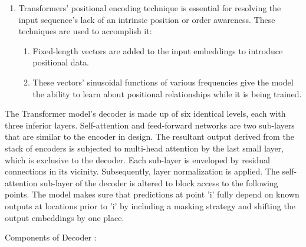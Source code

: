 \begin{enumerate}
\begin{enumerate}
    \end{enumerate}

    \item Transformers' positional encoding technique is essential for resolving the input sequence's lack of an intrinsic position or order awareness. These techniques are used to accomplish it:


    \begin{enumerate}
      \item  Fixed-length vectors are added to the input embeddings to introduce positional data.
       \item  These vectors' sinusoidal functions of various frequencies give the model the ability to learn about positional relationships while it is being trained.


    \end{enumerate}
\end{enumerate}

The Transformer model's decoder is made up of six identical levels, each with three inferior layers. Self-attention and feed-forward networks are two sub-layers that are similar to the encoder in design. The resultant output derived from the stack of encoders is subjected to multi-head attention by the last small layer, which is exclusive to the decoder. Each sub-layer is enveloped by residual connections in its vicinity. Subsequently, layer normalization is applied. The self-attention sub-layer of the decoder is altered to block access to the following points. The model makes sure that predictions at point 'i' fully depend on known outputs at locations prior to 'i' by including a masking strategy and shifting the output embeddings by one place.



Components of Decoder : 

